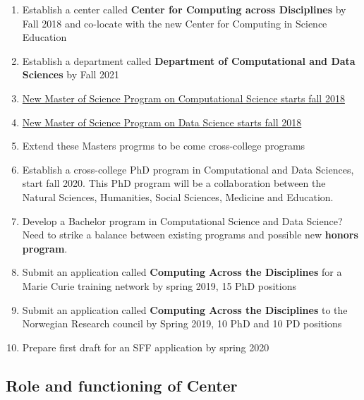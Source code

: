 \documentclass[%
oneside,                 %
final,                   %
10pt]{article}
\begin{document}
\begin{enumerate}
\item Establish a center called \textbf{Center for Computing across Disciplines} by Fall 2018 and co-locate with the new Center for Computing in Science Education

\item Establish a department  called \textbf{Department of Computational and Data Sciences} by Fall 2021

\item \href{{http://www.uio.no/english/studies/programmes/computational-science-master/index.html}}{New Master of Science Program on Computational Science starts fall 2018}

\item \href{{http://www.uio.no/english/studies/programmes/datascience-master/index.html}}{New Master of Science Program on Data Science starts fall 2018}

\item Extend these Masters progrms to be come cross-college programs

\item Establish  a cross-college PhD program in Computational and Data Sciences, start fall 2020. This PhD program will be a collaboration between the Natural Sciences, Humanities, Social Sciences, Medicine and Education. 

\item Develop a Bachelor program in Computational Science and Data Science? Need to strike a balance between existing programs and possible new \textbf{honors program}. 

\item Submit an application called \textbf{Computing Across the Disciplines} for a Marie Curie training network by spring 2019, 15 PhD positions

\item Submit an application called \textbf{Computing Across the Disciplines} to the Norwegian Research council by Spring 2019, 10 PhD and 10 PD positions

\item Prepare first draft for an SFF application by  spring 2020
\end{enumerate}

\noindent
\subsection*{Role and functioning of Center}
\end{document}
